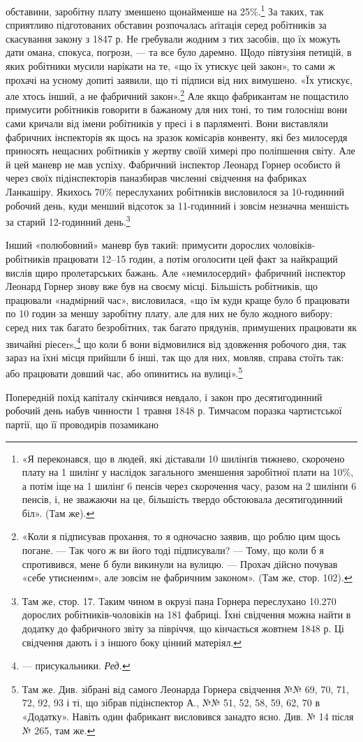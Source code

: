 \parcont{}  %
обставини, заробітну плату зменшено щонайменше на 25\%.\footnote{
«Я переконався, що в людей, які діставали 10 шилінґів тижнево,
скорочено плату на 1 шилінґ у наслідок загального зменшення заробітної
плати на 10\%, а потім іще на 1 шилінґ 6 пенсів через скорочення часу,
разом на 2 шилінґи 6 пенсів, і, не зважаючи на це, більшість твердо обстоювала
десятигодинний біл». (Там же).
}
За таких, так сприятливо підготованих обставин розпочалась
аґітація серед робітників за скасування закону з 1847 р. Не гребували
жодним з тих засобів, що їх можуть дати омана, спокуса,
погрози, — та все було даремно. Щодо півтузіня петицій, в яких
робітники мусили нарікати на те, «що їх утискує цей закон», то
сами ж прохачі на усному допиті заявили, що ті підписи від них
вимушено. «Їх утискує, але хтось інший, а не фабричний закон».\footnote{
«Коли я підписував прохання, то я одночасно заявив, що роблю
цим щось погане. — Так чого ж ви його тоді підписували? — Тому, що коли б
я спротивився, мене б були викинули на вулицю. — Прохач дійсно почував
«себе утисненим», але зовсім не фабричним законом». (Там же, стор. 102).
}
Але якщо фабрикантам не пощастило примусити робітників
говорити в бажаному для них тоні, то тим голосніш вони сами
кричали від імени робітників у пресі і в парляменті. Вони виставляли
фабричних інспекторів як щось на зразок комісарів конвенту,
які без милосердя приносять нещасних робітників у жертву
своїй химері про поліпшення світу. Але й цей маневр не мав
успіху. Фабричний інспектор Леонард Горнер особисто й через
своїх підінспекторів паназбирав численні свідчення на фабриках
Ланкашіру. Якихось 70\% переслуханих робітників висловилося
за 10-годинний робочий день, куди менший відсоток за 11-годинний
і зовсім незначна меншість за старий 12-годинний день.\footnote{
Там же, стор. 17. Таким чином в окрузі пана Горнера переслухано
\num{10.270} дорослих робітників-чоловіків на 181 фабриці. Їхні свідчення
можна найти в додатку до фабричного звіту за півріччя, що кінчається
жовтнем 1848 р. Ці свідчення дають і з іншого боку цінний матеріял.
}

Інший «полюбовний» маневр був такий: примусити дорослих
чоловіків-робітників працювати 12--15 годин, а потім оголосити
цей факт за найкращий вислів щиро пролетарських бажань.
Але «немилосердий» фабричний інспектор Леонард Горнер знову
вже був на своєму місці. Більшість робітників, що працювали
«надмірний час», висловилася, «що їм куди краще було б працювати
по 10 годин за меншу заробітну плату, але для них не було
жодного вибору: серед них так багато безробітних, так багато
прядунів, примушених працювати як звичайні ріесеrs,\footnote*{
— присукальники. \emph{Ред.}
} що
коли б вони відмовилися від здовження робочого дня, так зараз
на їхні місця прийшли б інші, так що для них, мовляв, справа
стоїть так: або працювати довший час, або опинитись на вулиці».\footnote{
Там же. Див. зібрані від самого Леонарда Горнера свідчення
№№ 69, 70, 71, 72, 92, 93 і ті, що зібрав підінспектор А., №№ 51, 52,
58, 59, 62, 70 в «Додатку». Навіть один фабрикант висловився занадто
ясно. Див. № 14 після № 265, там же.
}

Попередній похід капіталу скінчився невдало, і закон про десятигодинний
робочий день набув чинности 1 травня 1848 р. Тимчасом
поразка чартистської партії, що її проводирів позамикано
\parbreak{}  %
